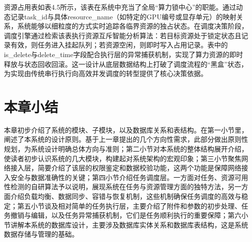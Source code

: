 资源占用表如表4.5所示，该表在系统中充当了全局“算力锁中心”的职能。通过动态记录task\_id与具体resource\_name（如特定的GPU编号或显存单元）的映射关系，系统能够以细粒度的方式实时追踪各临界资源的独占状态。在调度决策阶段，调度引擎通过检索该表执行资源互斥智能分析算法：若目标资源处于锁定状态且记录有效，则任务进入挂起队列；若资源空闲，则即时写入占用记录。表中的is\_delete与delete\_time字段配合执行层的异常捕获机制，实现了算力资源的即时释放与状态回收回滚。这一设计从底层数据结构上打破了调度流程的“黑盒”状态，为实现由传统串行执行向高效并发调度的转型提供了核心决策依据。

\section{本章小结}

本章初步介绍了系统的模块、子模块，以及数据库关系和表结构。在第一小节里，阐述了本系统的设计原则。基于上一章提出的几个方向性需求，此部分做出原则性规划，为系统设计明确总体方向与准则；第二小节对本系统的整体结构展开介绍，使读者初步认识系统的几大模块，构建起对系统架构的宏观印象；第三小节聚焦网络接入层，简要介绍了该层的权限鉴定和数据校验功能，这两个功能是保障网络接入安全与数据准确性的关键；第四小节介绍任务调度层。一方面对任务、资源可用性检测的自研算法予以说明，展现系统在任务与资源管理方面的独特方法，另一方面介绍负载均衡、数据同步、容错与恢复机制，这些机制确保任务调度的高效与稳定；第五小节谈及相对简单的任务执行层，主要介绍了附件和参数的初步处理、任务撤销与编辑，以及任务异常捕获机制，它们是任务顺利执行的重要保障；第六小节讲解本系统的数据库设计，主要涉及数据库实体关系和数据库表结构，这是系统数据存储与管理的基础。

\makeatletter
\@openrightfalse
\makeatother